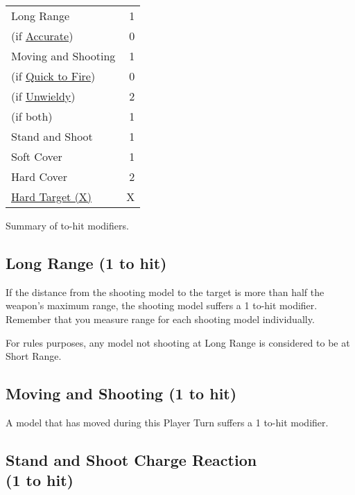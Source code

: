 \begin{Figure}
	\Tanchor
	\centering
	\begin{tabular}{p{4cm} r}
		\toprule
		Long Range & \minuss{}1 \\
		\hspace*{0.3cm}(if \hyperref[accurate]{Accurate}\idx{Accurate}) & 0 \\
		Moving and Shooting & \minuss{}1 \\
		\hspace*{0.3cm}(if \hyperref[quick_to_fire]{Quick to Fire}) & 0 \\
		\hspace*{0.3cm}(if \hyperref[unwieldy]{Unwieldy}) & \minuss{}2 \\
		\hspace*{0.3cm}(if both) & \minuss{}1 \\
		Stand and Shoot & \minuss{}1 \\
		Soft Cover & \minuss{}1 \\
		Hard Cover & \minuss{}2 \\
		\hyperref[hard_target]{Hard Target (X)} & \minuss{}X \\
		\bottomrule
	\end{tabular}
	\caption{Summary of to-hit modifiers.}
	\label{table/to_hit_modifiers}
\end{Figure}

\subsection{Long Range (\minuss{}1 to hit)}
\label{long_range}

If the distance from the shooting model to the target is more than half the weapon's maximum  range, the shooting model suffers a \minuss{}1 to-hit modifier. Remember that you measure range for each shooting model individually.

For rules purposes, any model not shooting at Long Range is considered to be at Short Range.

\subsection{Moving and Shooting (\minuss{}1 to hit)}
\label{moving_and_shooting}

A model that has moved during this Player Turn suffers a \minuss{}1 to-hit modifier.

\subsection[Stand and Shoot Charge Reaction (\minuss{}1 to hit)]{Stand and Shoot Charge Reaction\\ (\minuss{}1 to hit)}
\label{stand_and_shoot_charge_reaction}

